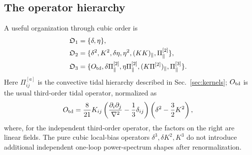 \documentclass[11pt,a4paper]{article}
\newcommand{\Otd}{O_{\rm td}}
\begin{document}
\subsection{The operator hierarchy}
A useful organization through cubic order is
\begin{align}
\mathfrak O_1&=\{\delta,\eta\},\\
\mathfrak O_2&=\{\delta^2,K^2,\delta\eta,\eta^2,(KK)_\parallel,\Pi^{[2]}_\parallel\},\\
\mathfrak O_3&=\{\Otd,\delta\Pi^{[2]}_\parallel,\eta\Pi^{[2]}_\parallel,
 (K\Pi^{[2]})_\parallel,\Pi^{[3]}_\parallel\}.
\end{align}
Here $\Pi^{[a]}_{ij}$ is the convective tidal hierarchy described in Sec.~\ref{sec:kernels}; $\Otd$ is the usual third-order tidal operator, normalized as
\begin{equation}
 \Otd=\frac8{21}K_{ij}\left(\frac{\partial_i\partial_j}{\nabla^2}-\frac13\delta_{ij}\right)
 \left(\delta^2-\frac32K^2\right),
\end{equation}
where, for the independent third-order operator, the factors on the right are linear fields. The pure cubic local-bias operators $\delta^3,\delta K^2,K^3$ do not introduce additional independent one-loop power-spectrum shapes after renormalization.
\end{document}
